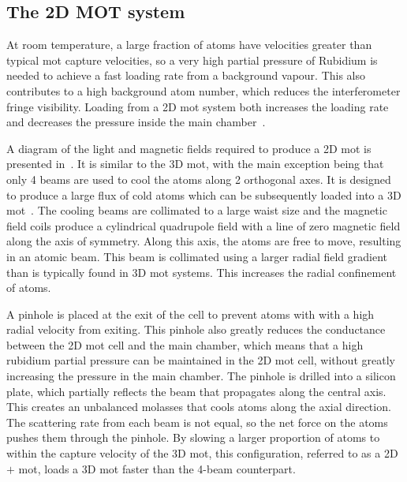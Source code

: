 \subsection{The 2D MOT system}\label{sec:2d_mot}
At room temperature, a large fraction of atoms have velocities greater than typical \ac{mot} capture velocities, so a very high partial pressure of
Rubidium is needed to achieve a fast loading rate from a background
vapour. This also contributes to a high background atom number, which
reduces the interferometer fringe visibility. Loading from a 2D
\ac{mot} system both increases the loading rate
and decreases the pressure inside the main chamber~\cite{Dieckmann1998}.  \par\noindent A diagram of the light and magnetic fields
required to produce a 2D \ac{mot} is presented
in~. It is similar to the 3D \ac{mot}, with the
main exception being that only 4 beams are used to cool the atoms along 2
orthogonal axes. It is designed to produce a large flux of cold atoms which can be subsequently loaded into a
3D \ac{mot}~\cite{Muller2007,Roos2003}. The cooling beams are collimated to a
large waist size and the magnetic field coils produce a cylindrical quadrupole
field with a line of zero magnetic field along the axis of symmetry. Along this
axis, the atoms are free to move, resulting in an atomic beam. This
beam is collimated using a larger radial field gradient than is
typically found in 3D \ac{mot} systems. This increases the radial
confinement of
atoms. 
\par\noindent 
A pinhole is placed at the exit of the cell to prevent atoms with
with a high radial velocity from exiting. This pinhole also
greatly reduces the conductance between the 2D \ac{mot} cell and the main
chamber, which means that a high rubidium partial pressure can be maintained in the 2D \ac{mot} cell, without greatly
increasing the pressure in the main chamber. The pinhole is drilled into a
silicon plate, which partially reflects the beam that propagates along
the central axis. This creates an unbalanced molasses that cools atoms
along the axial direction. The scattering rate from each beam is not
equal, so the net force on the atoms pushes them through the pinhole.
By slowing a larger proportion of atoms to within the
capture velocity of the 3D \ac{mot}, this configuration, referred to as a 2D\(+\)
\ac{mot}, loads a 3D \ac{mot} faster than the 4-beam counterpart. \par\noindent
